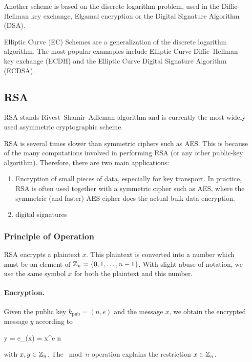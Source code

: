 Another scheme is based on the discrete logarithm problem, used in the Diffie-Hellman key exchange, Elgamal encryption or the Digital Signature Algorithm (DSA).

Elliptic Curve (EC) Schemes are a generalization of the discrete logarithm algorithm. The most popular examaples include Elliptic Curve Diffie–Hellman key exchange (ECDH) and the Elliptic Curve Digital Signature Algorithm (ECDSA).


\subsection{RSA}


RSA stands Rivest–Shamir–Adleman algorithm and is currently the most widely used asymmetric cryptographic scheme.

RSA is several times slower than symmetric ciphers such as AES. This is because of the many computations involved in performing RSA (or any other public-key algorithm). Therefore, there are two main applications:

\begin{enumerate}
	\item Encryption of small pieces of data, especially for key transport. In practice, RSA is often used together with a symmetric cipher such as AES, where the symmetric (and faster) AES cipher does the actual bulk data encryption.

	\item digital signatures
\end{enumerate}


\subsubsection{Principle of Operation}

RSA encrypts a plaintext $x$. This plaintext is converted into a number which must be an element of $\mathbb{Z}_n = \{0,1,\ldots,n-1\}$. With slight abuse of notation, we use the same symbol $x$ for both the plaintext and this number.

\paragraph{Encryption.} Given the public key $k_{\text{pub}} = (n,e)$ and the message $x$, we obtain the encrypted message $y$ according to

\bee
y = e_{}(x) = x^e \bmod n
\eee

with $x,y \in \mathbb{Z}_n$. The $\bmod n$ operation explains the restriction $x \in \mathbb{Z}_n$.

